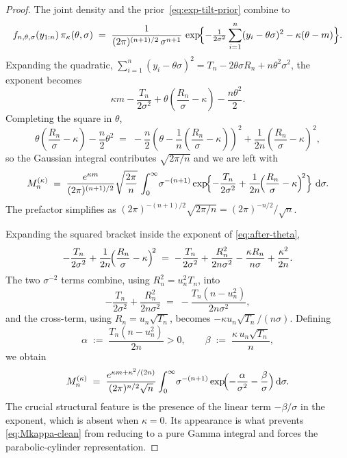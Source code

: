 \documentclass[12pt, a4paper]{report}
\newcommand{\dd}{\,\mathrm{d}}
\newcommand{\1}{\mathbf{1}}
\begin{document}
\begin{proof}
The joint density and the prior~\eqref{eq:exp-tilt-prior} combine to
\begin{equation}\label{eq:integrand}
  f_{n,\theta,\sigma}(y_{1:n})\,\pi_\kappa(\theta,\sigma)
  \;=\;\frac{1}{(2\pi)^{(n+1)/2}\,\sigma^{n+1}}\,
  \exp\!\Bigl\{-\tfrac{1}{2\sigma^2}\sum_{i=1}^n(y_i-\theta\sigma)^2
  -\kappa(\theta-m)\Bigr\}.
\end{equation}
Expanding the quadratic, $\sum_{i=1}^n(y_i-\theta\sigma)^2
=T_n-2\theta\sigma R_n+n\theta^2\sigma^2$, the exponent becomes
\[
  \kappa m-\frac{T_n}{2\sigma^2}
  +\theta\!\left(\frac{R_n}{\sigma}-\kappa\right)-\frac{n\theta^2}{2}.
\]
Completing the square in $\theta$,
\[
  \theta\!\left(\frac{R_n}{\sigma}-\kappa\right)-\frac{n}{2}\theta^2
  \;=\;-\frac{n}{2}\!\left(\theta-\frac{1}{n}\!\left(\frac{R_n}{\sigma}-\kappa\right)\right)^{\!2}
  +\frac{1}{2n}\!\left(\frac{R_n}{\sigma}-\kappa\right)^{\!2}\!,
\]
so the Gaussian integral contributes $\sqrt{2\pi/n}$
and we are left with
\begin{equation}\label{eq:after-theta}
  M_n^{(\kappa)}
  \;=\;\frac{e^{\kappa m}}{(2\pi)^{(n+1)/2}}\sqrt{\frac{2\pi}{n}}\,
  \int_0^\infty\!\sigma^{-(n+1)}
  \exp\!\Bigl\{-\frac{T_n}{2\sigma^2}
  +\frac{1}{2n}\!\Bigl(\frac{R_n}{\sigma}-\kappa\Bigr)^{\!2}\Bigr\}\,\dd\sigma.
\end{equation}
The prefactor simplifies as $(2\pi)^{-(n+1)/2}\sqrt{2\pi/n}
=(2\pi)^{-n/2}/\sqrt n$.

Expanding the squared bracket inside the exponent of
\eqref{eq:after-theta},
\[
  -\frac{T_n}{2\sigma^2}
  +\frac{1}{2n}\!\Bigl(\frac{R_n}{\sigma}-\kappa\Bigr)^{\!2}
  \;=\;-\frac{T_n}{2\sigma^2}+\frac{R_n^2}{2n\sigma^2}
  -\frac{\kappa R_n}{n\sigma}+\frac{\kappa^2}{2n}.
\]
The two $\sigma^{-2}$ terms combine, using $R_n^2=u_n^2 T_n$, into
\[
  -\frac{T_n}{2\sigma^2}+\frac{R_n^2}{2n\sigma^2}
  \;=\;-\frac{T_n(n-u_n^2)}{2n\sigma^2},
\]
and the cross-term, using $R_n=u_n\sqrt{T_n}$, becomes
$-\kappa u_n\sqrt{T_n}/(n\sigma)$. Defining
\begin{equation}\label{eq:ab}
  \alpha\;:=\;\frac{T_n(n-u_n^2)}{2n}>0,\qquad
  \beta\;:=\;\frac{\kappa\,u_n\sqrt{T_n}}{n},
\end{equation}
we obtain
\begin{equation}\label{eq:Mkappa-clean}
  M_n^{(\kappa)}
  \;=\;\frac{e^{\kappa m+\kappa^2/(2n)}}{(2\pi)^{n/2}\sqrt n}
  \int_0^\infty\!\sigma^{-(n+1)}
  \exp\!\Bigl(-\frac{\alpha}{\sigma^2}-\frac{\beta}{\sigma}\Bigr)\dd\sigma.
\end{equation}
The crucial structural feature is the presence of the linear term
$-\beta/\sigma$ in the exponent, which is absent when $\kappa=0$. Its
appearance is what prevents \eqref{eq:Mkappa-clean} from reducing to a
pure Gamma integral and forces the parabolic-cylinder representation.


\end{proof}
\end{document}
